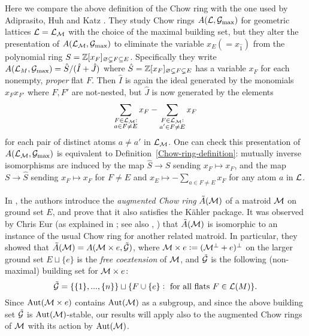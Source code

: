 \begin{remark}
    Here we compare the above definition of the Chow ring with the one used by Adiprasito, Huh and Katz \cite{AHK}. They study  Chow rings $A(\mathcal{L},\mathcal{G}_{\max})$ for geometric lattices $\mathcal{L}=\mathcal{L}_{\mathcal{M}}$ with the choice of the maximal building set, but they alter the presentation of $A(\mathcal{L}_{\mathcal{M}}, \mathcal{G}_{\max})$ to eliminate the variable
    $x_E (=x_{\hat{1}})$ from the polynomial ring $S=\mathbb{Z}[x_F]_{\varnothing \subsetneq F \subseteq E}$.  Specifically they write $A(\mathcal{L}_M, \mathcal{G}_{\max})=\hat{S}/(\hat{I} + \hat{J})$ where $\hat{S}=\mathbb{Z}[x_F]_{\varnothing \subsetneq F \subsetneq E}$ has
    a variable $x_F$ for each nonempty, \emph{proper} flat $F$.  Then $\hat{I}$ is again the ideal generated by the monomials $x_{F} x_{F'}$ where $F, F'$ are not-nested, but $\hat{J}$ is now generated by the elements
    \[
    \displaystyle\sum_{\substack{F \in \mathcal{L}{_{\mathcal{M}}}:\\a \in F \neq E}} x_F
    - \displaystyle\sum_{\substack{F \in \mathcal{L}_{\mathcal{M}}:\\ a' \in F \neq E}} x_F
    \]
    for each pair of distinct atoms $a \neq a'$ in $\mathcal{L}_{\mathcal{M}}$.  One can check this presentation of $A(\mathcal{L}_{\mathcal{M}}, \mathcal{G}_{\max})$ is equivalent to 
    Definition~\ref{Chow-ring-definition}: mutually inverse isomorphisms are induced by the map $\hat{S} \rightarrow S$ sending $x_F \longmapsto x_F$, and the map $S \rightarrow \hat{S}$ sending $x_F \longmapsto x_F$ for $F \neq E$ and $x_E \longmapsto -\displaystyle\sum_{a \in F \neq E} x_F$ for any atom $a$ in $\mathcal{L}$.
\end{remark}

\begin{remark}
In \cite{BHMPW}, the authors introduce
the {\it augmented Chow ring} $\tilde{A}(\mathcal{M})$ of a matroid $\mathcal{M}$ on ground set $E$,
and prove that it also satisfies the K\"ahler package.
It was observed by Chris Eur \big(as explained in \cite[\S4, p.~1843]{MaestroniMcCullough}; see also \cite[\S5]{EHL}, \cite[Thm.~5.10]{Liao_new}\big) that $\tilde{A}(\mathcal{M})$ is isomorphic to an instance of the usual Chow ring for another related matroid. In particular, they showed that $\tilde{A}(\mathcal{M}) = A(\mathcal{M} \times e,\tilde{\mathcal{G}})$, where $\mathcal{M} \times e:=(\mathcal{M}^\perp + e)^\perp$ on the larger ground set $E \sqcup \{e\}$ is the {\it free coextension} of $\mathcal{M}$, and $\tilde{\mathcal{G}}$ is the following (non-maximal) building set 
for $\mathcal{M} \times e$:
$$
\tilde{\mathcal{G}}= \{\{1\},...,\{n\}\} \sqcup \{ F\cup \{e\}: \text{ for all flats  }F \in \mathcal{L}(M)\}.
$$
 Since $\operatorname{\mathrm{Aut}}( \mathcal{M} \times e)$ contains $\operatorname{\mathrm{Aut}}(\mathcal{M})$ as a subgroup,
 and since the above building set $\tilde{\mathcal{G}}$ is $\operatorname{\mathrm{Aut}}(\mathcal{M})$-stable, our results will apply
also to the augmented Chow rings of $\mathcal{M}$ with
its action by $\operatorname{\mathrm{Aut}}(\mathcal{M})$.
\end{remark}





